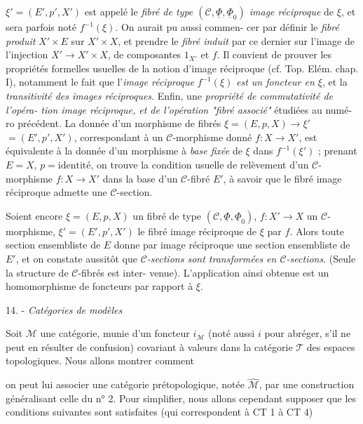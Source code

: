 $\xi' = (E',p',X')$ est appelé le \emph{fibré de type $(\mathcal{C}, \underline{\Phi}, \underline{\Phi}_0)$ image
réciproque} de $\xi$, et sera parfois noté $f^{-1}(\xi)$. On aurait pu aussi commen-
cer par définir le \emph{fibré produit} $X' \times E$ sur $X' \times X$, et prendre le \emph{fibré
induit} par ce dernier sur l'image de l'injection $X' \to X' \times X$, de composantes
$1_{X'}$ et $f$. Il convient de prouver les propriétés formelles usuelles de
la notion d'image réciproque (cf. Top. Elém. chap. I), notamment le fait
que l'\emph{image réciproque} $f^{-1}(\xi)$ \emph{est un foncteur en $\xi$}, et la \emph{transitivité
des images réciproques}. Enfin, une \emph{propriété de commutativité de l'opéra-
tion image réciproque, et de l'opération "fibré associé"} étudiées au numé-
ro précédent. La donnée d'un morphisme de fibrés $\xi = (E,p,X) \to \xi' $
$= (E',p',X')$, correspondant à un $\mathcal{C}$-morphisme donné $f : X \to X'$, est
équivalente à la donnée d'un morphisme à \emph{base fixée} de $\xi$ dans $f^{-1}(\xi')$ ;
prenant $E=X$, $p=\text{identité}$, on trouve la condition usuelle de relèvement
d'un $\mathcal{C}$-morphisme $f:X \to X'$ dans la base d'un $\mathcal{C}$-fibré $E'$, à savoir
que le fibré image réciproque admette une $\mathcal{C}$-section.

Soient encore $\xi = (E,p,X)$ un fibré de type $(\mathcal{C}, \underline{\Phi}, \underline{\Phi}_0)$, $f: X' \to X$
un $\mathcal{C}$-morphisme, $\xi' = (E', p', X')$ le fibré image réciproque de $\xi$ par
$f$. Alors toute section ensembliste de $E$ donne par image réciproque une
section ensembliste de $E'$, et on constate aussitôt que \emph{$\mathcal{C}$-sections sont
transformées en $\mathcal{C}$-sections}. (Seule la structure de $\mathcal{C}$-fibrés est inter-
venue). L'application ainsi obtenue est un homomorphisme de foncteurs
par rapport à $\xi$.

14. - \emph{Catégories de modèles}

Soit $\mathcal{M}$ une catégorie, munie d'un foncteur $i_{\mathcal{M}}$ (noté aussi $i$ pour
abréger, s'il ne peut en résulter de confusion) covariant à valeurs dans
la catégorie $\mathcal{T}$ des espaces topologiques. Nous allons montrer comment

\newpage



on peut lui associer une catégorie prétopologique, notée $\hat{\mathcal{M}}$, par une
construction généralisant celle du n° 2. Pour simplifier, nous allons
cependant supposer que les conditions suivantes sont satisfaites (qui
correspondent à CT 1 à CT 4)

